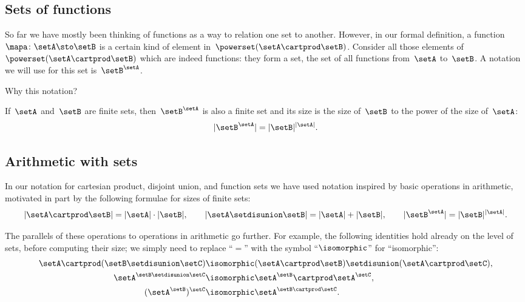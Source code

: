 
\subsection{Sets of functions}

So far we have mostly been thinking of functions as a way to relation one set to another.
However, in our formal definition, a function~$\mapa \colon \setA \sto \setB$ is a certain kind of element in~$\powerset (\setA \cartprod \setB)$.
Consider all those elements of~$\powerset (\setA \cartprod \setB)$ which are indeed functions: they form a set, the set of all functions from~$\setA$ to~$\setB$.
A notation we will use for this set is~$\setB^{\setA}$.

Why this notation?

If~$\setA$ and~$\setB$ are finite sets, then~$\setB^{\setA}$ is also a finite set and its size is the size of~$\setB$ to the power of the size of~$\setA$:
\begin{equation}
    \vert \setB^{\setA} \vert = \vert \setB \vert^{\vert \setA \vert}.
\end{equation}

\subsection{Arithmetic with sets}

In our notation for cartesian product, disjoint union, and function sets we have used notation inspired by basic operations in arithmetic, motivated in part by the following formulae for sizes of finite sets:
\begin{equation}
    \vert \setA \cartprod \setB \vert = \vert \setA \vert \cdot \vert \setB \vert, \qquad \vert \setA \setdisunion \setB \vert = \vert \setA \vert + \vert \setB \vert, \qquad \vert \setB^{\setA} \vert = \vert \setB \vert^{\vert \setA \vert}.
\end{equation}

The parallels of these operations to operations in arithmetic go further.
For example, the following identities hold already on the level of sets, before computing their size; we simply need to replace ``$=$'' with the symbol ``$\isomorphic$'' for ``isomorphic'':
\begin{align*}
    \setA \cartprod (\setB \setdisunion \setC) & \isomorphic (\setA \cartprod \setB) \setdisunion (\setA \cartprod \setC), \\
    \setA^{\setB \setdisunion \setC}           & \isomorphic \setA^\setB \cartprod \setA^\setC, \\
    (\setA^\setB)^\setC                        & \isomorphic \setA^{\setB \cartprod \setC}.
\end{align*}

